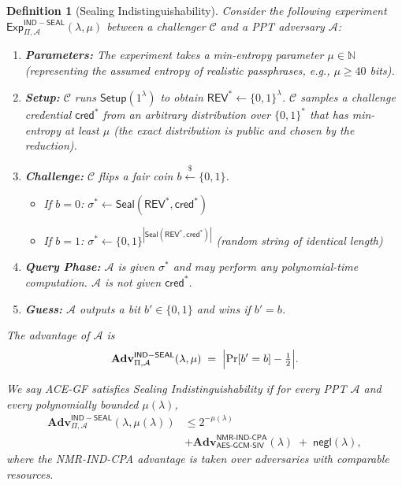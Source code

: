 \documentclass[12pt,a4paper]{article}
\newcommand{\negl}{\mathsf{negl}}
\newtheorem{definition}{Definition}
\begin{document}
  \begin{definition}[Sealing Indistinguishability]\label{def:ind-seal}
  Consider the following experiment $\mathsf{Exp}_{\Pi,\mathcal{A}}^{\mathsf{IND-SEAL}}(\lambda,\mu)$ between a challenger $\mathcal{C}$ and a PPT adversary $\mathcal{A}$:

  \begin{enumerate}
   \item \textbf{Parameters:} The experiment takes a min-entropy parameter $\mu \in \mathbb{N}$ (representing the assumed entropy of realistic passphrases, e.g., $\mu \ge 40$ bits).
   \item \textbf{Setup:} $\mathcal{C}$ runs $\mathsf{Setup}(1^\lambda)$ to obtain $\mathsf{REV}^* \gets \{0,1\}^\lambda$.
   $\mathcal{C}$ samples a challenge credential $\mathsf{cred}^*$ from an arbitrary distribution over $\{0,1\}^*$ that has min-entropy at least $\mu$ (the exact distribution is public and chosen by the reduction).
   \item \textbf{Challenge:} $\mathcal{C}$ flips a fair coin $b \overset{\$}{\gets} \{0,1\}$.
   \begin{itemize}
  \item If $b=0$: $\sigma^* \gets \mathsf{Seal}(\mathsf{REV}^*,\mathsf{cred}^*)$
  \item If $b=1$: $\sigma^* \gets \{0,1\}^{|\mathsf{Seal}(\mathsf{REV}^*,\mathsf{cred}^*)|}$ (random string of identical length)
   \end{itemize}
   \item \textbf{Query Phase:} $\mathcal{A}$ is given $\sigma^*$ and may perform any polynomial-time computation. $\mathcal{A}$ is \emph{not} given $\mathsf{cred}^*$.
   \item \textbf{Guess:} $\mathcal{A}$ outputs a bit $b' \in \{0,1\}$ and wins if $b'=b$.
  \end{enumerate}

  The advantage of $\mathcal{A}$ is
  \[
   \mathbf{Adv}_{\Pi,\mathcal{A}}^{\mathsf{IND-SEAL}}(\lambda,\mu) \;=\;
   \Bigl|\Pr[b'=b] - \tfrac{1}{2}\Bigr|.
  \]

  We say ACE-GF satisfies \emph{Sealing Indistinguishability} if for every PPT $\mathcal{A}$ and every polynomially bounded $\mu(\lambda)$,
 \begin{equation*}
 \begin{split}
 \mathbf{Adv}_{\Pi,\mathcal{A}}^{\mathsf{IND-SEAL}}(\lambda,\mu(\lambda))
 &\le 2^{-\mu(\lambda)} \\
 &+ \mathbf{Adv}_{\mathsf{AES\text{-}GCM\text{-}SIV}}^{\mathsf{NMR\text{-}IND\text{-}CPA}}(\lambda) \;+\; \negl(\lambda),
 \end{split}
 \end{equation*}
  where the NMR-IND-CPA advantage is taken over adversaries with comparable resources.
  \end{definition}
\end{document}
